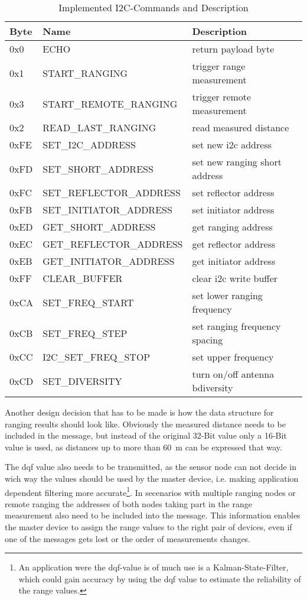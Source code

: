 \begin{table}
	
	\begin{tabularx}{\columnwidth}{l | l | X}
	Byte & Name & Description \\ \hline
	0x0  & ECHO & return payload byte\\
	0x1  & START\_RANGING & trigger range measurement\\
	0x3  & START\_REMOTE\_RANGING & trigger remote measurement\\
	0x2  & READ\_LAST\_RANGING & read measured distance\\
	0xFE & SET\_I2C\_ADDRESS & set new i2c address\\
	0xFD & SET\_SHORT\_ADDRESS & set new ranging short address\\
	0xFC & SET\_REFLECTOR\_ADDRESS & set reflector address\\
	0xFB & SET\_INITIATOR\_ADDRESS & set initiator address\\
	0xED & GET\_SHORT\_ADDRESS & get ranging address\\
	0xEC & GET\_REFLECTOR\_ADDRESS & get reflector address\\
	0xEB & GET\_INITIATOR\_ADDRESS & get initiator address\\
	0xFF & CLEAR\_BUFFER & clear i2c write buffer\\
	0xCA & SET\_FREQ\_START & set lower ranging frequency\\
	0xCB & SET\_FREQ\_STEP & set ranging frequency spacing\\
	0xCC & I2C\_SET\_FREQ\_STOP & set upper frequency\\
	0xCD & SET\_DIVERSITY & turn on/off antenna bdiversity\\
	\end{tabularx}

	\caption{Implemented I2C-Commands and Description}
	
\end{table}

Another design decision that has to be made is how the data structure for ranging results should look like.
Obviously the measured distance needs to be included in the message, but instead of the original 32-Bit value only a 16-Bit value is used, as distances up to more than \SI{60}{\metre} can be expressed that way.

The dqf value also needs to be transmitted, as the sensor node can not decide in wich way the values should be used by the master device, i.e. making application dependent filtering more accurate\footnote{
	An application were the dqf-value is of much use is a Kalman-State-Filter, which could gain accuracy by using the dqf value to estimate the reliability of the range values.
}.
In secenarios with multiple ranging nodes or remote ranging the addresses of both nodes taking part in the range measurement also need to be included into the message.
This information enables the master device to assign the range values to the right pair of devices, even if one of the messages gets lost or the order of measurements changes.

